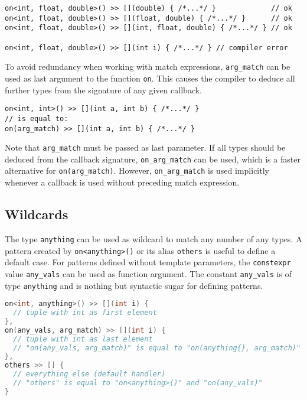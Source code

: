 \begin{lstlisting}
on<int, float, double>() >> [](double) { /*...*/ }             // ok
on<int, float, double>() >> [](float, double) { /*...*/ }      // ok
on<int, float, double>() >> [](int, float, double) { /*...*/ } // ok

on<int, float, double>() >> [](int i) { /*...*/ } // compiler error
\end{lstlisting}

To avoid redundancy when working with match expressions, \lstinline^arg_match^ can be used as last argument to the function \lstinline^on^.
This causes the compiler to deduce all further types from the signature of any given callback.

\begin{lstlisting}
on<int, int>() >> [](int a, int b) { /*...*/ }
// is equal to:
on(arg_match) >> [](int a, int b) { /*...*/ }
\end{lstlisting}

Note that \lstinline^arg_match^ must be passed as last parameter.
If all types should be deduced from the callback signature, \lstinline^on_arg_match^ can be used, which is a faster alternative for \lstinline^on(arg_match)^.
However, \lstinline^on_arg_match^ is used implicitly whenever a callback is used without preceding match expression.

\clearpage
\subsection{Wildcards}
\label{Sec::PatternMatching::Wildcards}

The type \lstinline^anything^ can be used as wildcard to match any number of any types.
A pattern created by \lstinline^on<anything>()^ or its alias \lstinline^others^ is useful to define a default case.
For patterns defined without template parameters, the \lstinline^constexpr^ value \lstinline^any_vals^ can be used as function argument.
The constant \lstinline^any_vals^ is of type \lstinline^anything^ and is nothing but syntactic sugar for defining patterns.

\begin{lstlisting}[language=C++]
on<int, anything>() >> [](int i) {
  // tuple with int as first element
},
on(any_vals, arg_match) >> [](int i) {
  // tuple with int as last element
  // "on(any_vals, arg_match)" is equal to "on(anything{}, arg_match)"
},
others >> [] {
  // everything else (default handler)
  // "others" is equal to "on<anything>()" and "on(any_vals)"
}
\end{lstlisting}

